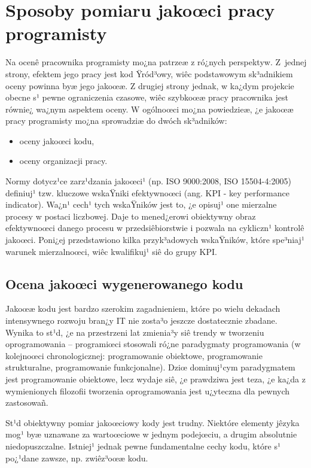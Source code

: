\section[Sposoby pomiaru jakoœci pracy programisty][Sposoby pomiaru jakoœci pracy programisty]
{Sposoby pomiaru jakoœci pracy programisty}
\label{sec:sposobyPomiaruJakosci}
Na ocenê pracownika programisty mo¿na patrzeæ z ró¿nych perspektyw. Z~jednej strony, efektem jego
pracy jest kod Ÿród³owy, wiêc podstawowym sk³adnikiem oceny powinna byæ jego jakoœæ. Z drugiej
strony jednak, w ka¿dym projekcie obecne s¹ pewne ograniczenia czasowe, wiêc szybkoœæ pracy
pracownika jest równie¿ wa¿nym aspektem oceny. W ogólnoœci mo¿na powiedzieæ, ¿e jakoœæ pracy
programisty mo¿na sprowadziæ do dwóch sk³adników:
\begin{itemize}
	\item oceny jakoœci kodu,
	\item oceny organizacji pracy.
\end{itemize}

Normy dotycz¹ce zarz¹dzania jakoœci¹ (np. ISO 9000:2008, ISO 15504-4:2005) definiuj¹ tzw. kluczowe 
wskaŸniki efektywnoœci (ang. KPI - key performance indicator). Wa¿n¹ cech¹ tych wskaŸników jest
to, ¿e opisuj¹ one mierzalne procesy w postaci liczbowej. Daje to mened¿erowi obiektywny obraz
efektywnoœci danego procesu w przedsiêbiorstwie i pozwala na cykliczn¹ kontrolê jakoœci. Poni¿ej
przedstawiono kilka przyk³adowych wskaŸników, które spe³niaj¹ warunek mierzalnoœci, wiêc kwalifikuj¹
siê do grupy KPI. 

\subsection[Ocena jakoœci wygenerowanego kodu][Ocena jakoœci wygenerowanego kodu]{Ocena jakoœci 
wygenerowanego kodu}
\label{subsec:ocenaJakosciKodu}
Jakoœæ kodu jest bardzo szerokim zagadnieniem, które po wielu dekadach intensywnego rozwoju bran¿y
IT nie zosta³o jeszcze dostatecznie zbadane. Wynika to st¹d, ¿e na przestrzeni lat zmienia³y siê
trendy w tworzeniu oprogramowania -- programiœci stosowali ró¿ne paradygmaty programowania (w 
kolejnoœci chronologicznej: programowanie obiektowe, programowanie strukturalne, programowanie 
funkcjonalne). Dziœ dominuj¹cym paradygmatem jest programowanie obiektowe, lecz wydaje siê, ¿e 
prawdziwa jest teza, ¿e ka¿da z wymienionych filozofii tworzenia oprogramowania jest u¿yteczna dla
pewnych zastosowañ.

St¹d obiektywny pomiar jakoœciowy kody jest trudny. Niektóre elementy jêzyka mog¹ byæ uznawane za
wartoœciowe w jednym podejœciu, a drugim absolutnie niedopuszczalne. Istniej¹ jednak pewne
fundamentalne cechy kodu, które s¹ po¿¹dane zawsze, np. zwiêz³oœæ kodu.


